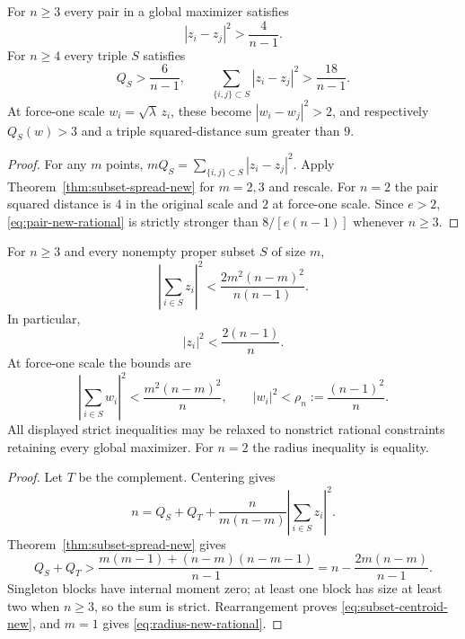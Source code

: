 \begin{corollary}\label{cor:pair-triple-new}
For $n\ge3$ every pair in a global maximizer satisfies
\begin{equation}\label{eq:pair-new-rational}
                    |z_i-z_j|^2>\frac4{n-1}.
\end{equation}
For $n\ge4$ every triple $S$ satisfies
\begin{equation}\label{eq:triple-new-rational}
 Q_S>\frac6{n-1},\qquad
 \sum_{\{i,j\}\subset S}|z_i-z_j|^2>\frac{18}{n-1}.
\end{equation}
At force-one scale $w_i=\sqrt\lambda\,z_i$, these become
$|w_i-w_j|^2>2$, and respectively $Q_S(w)>3$ and a triple
squared-distance sum greater than $9$.
\end{corollary}
\begin{proof}
For any $m$ points,
$mQ_S=\sum_{\{i,j\}\subset S}|z_i-z_j|^2$.
Apply Theorem~\ref{thm:subset-spread-new} for $m=2,3$ and rescale.
For $n=2$ the pair squared distance is $4$ in the original scale and
$2$ at force-one scale. Since $e>2$, \eqref{eq:pair-new-rational}
is strictly stronger than $8/[e(n-1)]$ whenever $n\ge3$.
\end{proof}

\begin{corollary}\label{cor:subset-centroid-new}
For $n\ge3$ and every nonempty proper subset $S$ of size $m$,
\begin{equation}\label{eq:subset-centroid-new}
 \left|\sum_{i\in S}z_i\right|^2
      <\frac{2m^2(n-m)^2}{n(n-1)}.
\end{equation}
In particular,
\begin{equation}\label{eq:radius-new-rational}
                    |z_i|^2<\frac{2(n-1)}n.
\end{equation}
At force-one scale the bounds are
\[
 \left|\sum_{i\in S}w_i\right|^2
       <\frac{m^2(n-m)^2}{n},\qquad
 |w_i|^2<\rho_n:=\frac{(n-1)^2}{n}.
\]
All displayed strict inequalities may be relaxed to nonstrict rational
constraints retaining every global maximizer. For $n=2$ the radius
inequality is equality.
\end{corollary}
\begin{proof}
Let $T$ be the complement. Centering gives
\[
 n=Q_S+Q_T+\frac{n}{m(n-m)}
                    \left|\sum_{i\in S}z_i\right|^2.
\]
Theorem~\ref{thm:subset-spread-new} gives
\[
 Q_S+Q_T>
 \frac{m(m-1)+(n-m)(n-m-1)}{n-1}
 =n-\frac{2m(n-m)}{n-1}.
\]
Singleton blocks have internal moment zero; at least one block has
size at least two when $n\ge3$, so the sum is strict. Rearrangement
proves \eqref{eq:subset-centroid-new}, and $m=1$ gives
\eqref{eq:radius-new-rational}.
\end{proof}

